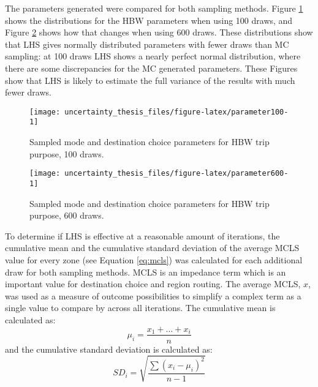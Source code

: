 \documentclass[fancy, masters]{byuthesis}
\begin{document}
The parameters generated were compared for both sampling methods. Figure \ref{fig:parameter100} shows the distributions for the HBW parameters when using 100 draws, and Figure \ref{fig:parameter600} shows how that changes when using 600 draws. These distributions show that LHS gives normally distributed parameters with fewer draws than MC sampling: at 100 draws LHS shows a nearly perfect normal distribution, where there are some discrepancies for the MC generated parameters. These Figures show that LHS is likely to estimate the full variance of the results with much fewer draws.

\begin{figure}

{\centering \texttt{[image: uncertainty\_thesis\_files/figure-latex/parameter100-1]} 

}

\caption{Sampled mode and destination choice parameters for HBW trip purpose, 100 draws.}\label{fig:parameter100}
\end{figure}

\begin{figure}

{\centering \texttt{[image: uncertainty\_thesis\_files/figure-latex/parameter600-1]} 

}

\caption{Sampled mode and destination choice parameters for HBW trip purpose, 600 draws.}\label{fig:parameter600}
\end{figure}

To determine if LHS is effective at a reasonable amount of iterations, the cumulative mean and the cumulative standard deviation of the average MCLS value for every zone (see Equation \eqref{eq:mcls}) was calculated for each additional draw for both sampling methods. MCLS is an impedance term which is an important value for destination choice and region routing. The average MCLS, \(x\), was used as a measure of outcome possibilities to simplify a complex term as a single value to compare by across all iterations. The cumulative mean is calculated as:
\begin{equation}
\mu_i = \frac{x_1 + ... + x_i}{n}
\label{eq:cmclsmean}
\end{equation}
and the cumulative standard deviation is calculated as:
\begin{equation}
SD_i = \sqrt{\frac{\sum (x_i - \mu_i)^2 }{n-1}}
\label{eq:sdi}
\end{equation}
\end{document}
